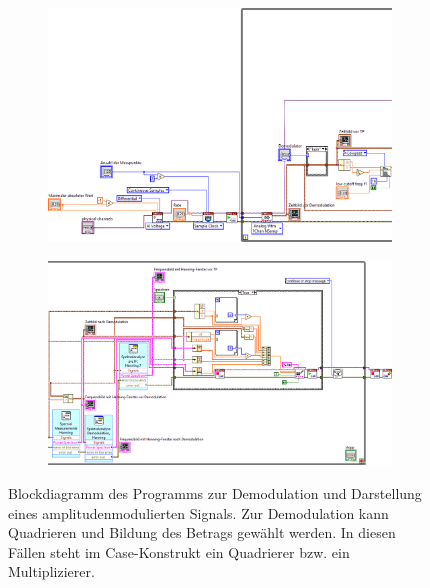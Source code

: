 \documentclass[
a4paper,
12pt,
pagesize,
ngerman
]{scrartcl}
\begin{document}
	\begin{figure}[H]
		\centering
		\begin{subfigure}[t]{0.88\textwidth}
			\centering
			\includegraphics[width=1.0\textwidth]{EIRE2018Dateien/Tag3/modifizierterOszi/Oszilloskop__modifiziertdTeil1}
		\end{subfigure}
		
		\vspace{0,2cm}
		
		\begin{subfigure}[t]{1.0\textwidth}
			\centering
			\includegraphics[width=1.0\textwidth]{EIRE2018Dateien/Tag3/modifizierterOszi/Oszilloskop__modifiziertdTeil2}
		\end{subfigure}
		\caption{Blockdiagramm des Programms zur Demodulation und Darstellung eines amplitudenmodulierten Signals. Zur Demodulation kann Quadrieren und Bildung des Betrags gewählt werden. In diesen Fällen steht im Case-Konstrukt ein Quadrierer bzw. ein Multiplizierer.}
		\label{fig_tag3_am_demod_block}
	\end{figure}
\end{document}

